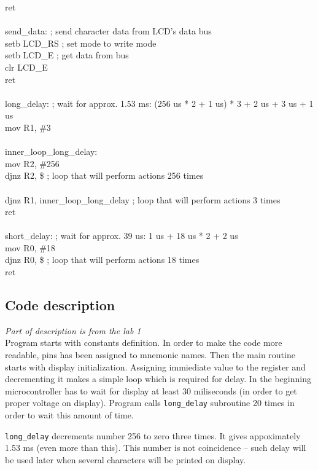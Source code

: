 \documentclass{article}
\begin{document}
    ret\\
\\
send\_data:          ; send character data from LCD's data bus\\
    setb    LCD\_RS  ; set mode to write mode\\
    setb    LCD\_E   ; get data from bus\\
    clr     LCD\_E\\
    ret\\
\\
long\_delay:         ; wait for approx. 1.53 ms: (256 us * 2 + 1 us) * 3 + 2 us + 3 us + 1 us\\
    mov     R1, \#3  \\
\\
inner\_loop\_long\_delay:\\
    mov     R2, \#256\\
    djnz    R2, \$                       ; loop that will perform actions 256 times\\
\\
    djnz    R1, inner\_loop\_long\_delay   ; loop that will perform actions 3 times\\
    ret\\
\\
short\_delay:            ; wait for approx. 39 us: 1 us + 18 us * 2 + 2 us\\
    mov     R0, \#18\\
    djnz    R0, \$       ; loop that will perform actions 18 times\\
    ret

\rmfamily

\subsection{Code description}
\emph{Part of description is from the lab 1}\\
Program starts with constants definition. In order to make the code more readable,
pins has been assigned to mnemonic names. Then the main routine starts with display
initialization. Assigning immiediate value to the register and decrementing it makes
a simple loop which is required for delay. In the beginning microcontroller has to wait
for display at least 30 miliseconds (in order to get proper voltage on display).
Program calls \texttt{long\_delay} subroutine 20 times in order to wait this amount of time.

\texttt{long\_delay} decrements number 256 to zero three times. It gives
appoximately 1.53 ms (even more than this). This number is not coincidence -- such delay
will be used later when several characters will be printed on display.
\end{document}
